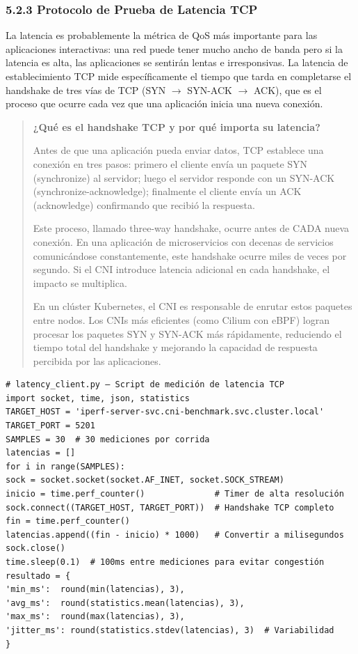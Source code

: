 \documentclass[journal]{IEEEtran}
\begin{document}
\subsubsection{5.2.3 Protocolo de Prueba de Latencia TCP}

La latencia es probablemente la métrica de QoS más importante para las aplicaciones interactivas: una red puede tener mucho ancho de banda pero si la latencia es alta, las aplicaciones se sentirán lentas e irresponsivas. La latencia de establecimiento TCP mide específicamente el tiempo que tarda en completarse el handshake de tres vías de TCP (SYN $\rightarrow$ SYN-ACK $\rightarrow$ ACK), que es el proceso que ocurre cada vez que una aplicación inicia una nueva conexión.

\begin{quote}
\textbf{¿Qué es el handshake TCP y por qué importa su latencia?}

Antes de que una aplicación pueda enviar datos, TCP establece una conexión en tres pasos: primero el cliente envía un paquete SYN (synchronize) al servidor; luego el servidor responde con un SYN-ACK (synchronize-acknowledge); finalmente el cliente envía un ACK (acknowledge) confirmando que recibió la respuesta.

Este proceso, llamado three-way handshake, ocurre antes de CADA nueva conexión. En una aplicación de microservicios con decenas de servicios comunicándose constantemente, este handshake ocurre miles de veces por segundo. Si el CNI introduce latencia adicional en cada handshake, el impacto se multiplica.

En un clúster Kubernetes, el CNI es responsable de enrutar estos paquetes entre nodos. Los CNIs más eficientes (como Cilium con eBPF) logran procesar los paquetes SYN y SYN-ACK más rápidamente, reduciendo el tiempo total del handshake y mejorando la capacidad de respuesta percibida por las aplicaciones.
\end{quote}

\begin{lstlisting}[basicstyle=\ttfamily\scriptsize,breaklines=true]
# latency_client.py — Script de medición de latencia TCP
import socket, time, json, statistics
TARGET_HOST = 'iperf-server-svc.cni-benchmark.svc.cluster.local'
TARGET_PORT = 5201
SAMPLES = 30  # 30 mediciones por corrida
latencias = []
for i in range(SAMPLES):
sock = socket.socket(socket.AF_INET, socket.SOCK_STREAM)
inicio = time.perf_counter()              # Timer de alta resolución
sock.connect((TARGET_HOST, TARGET_PORT))  # Handshake TCP completo
fin = time.perf_counter()
latencias.append((fin - inicio) * 1000)   # Convertir a milisegundos
sock.close()
time.sleep(0.1)  # 100ms entre mediciones para evitar congestión
resultado = {
'min_ms':  round(min(latencias), 3),
'avg_ms':  round(statistics.mean(latencias), 3),
'max_ms':  round(max(latencias), 3),
'jitter_ms': round(statistics.stdev(latencias), 3)  # Variabilidad
}
\end{lstlisting}
\end{document}
